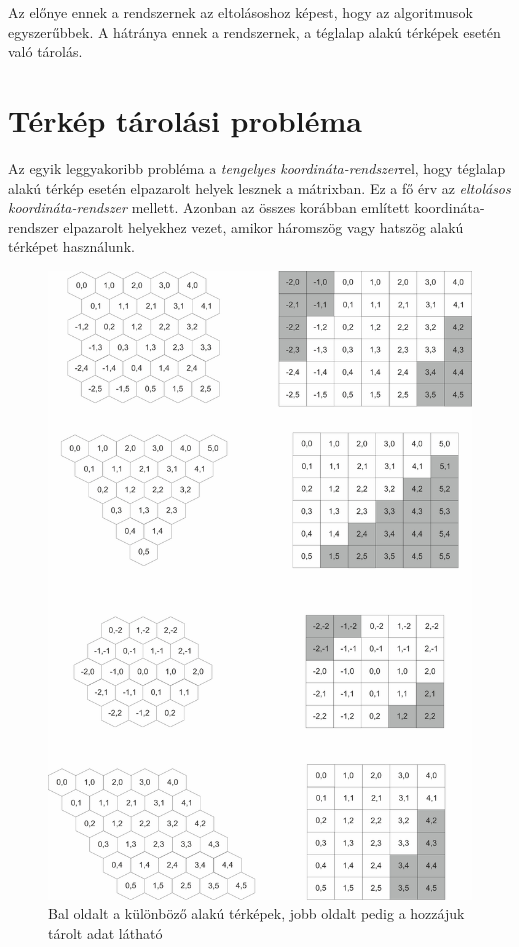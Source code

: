 \noindent Az előnye ennek a rendszernek az eltolásoshoz képest, hogy az algoritmusok egyszerűbbek. A hátránya ennek a rendszernek, a téglalap alakú térképek esetén való tárolás. 

\newpage 

\section{Térkép tárolási probléma}

Az egyik leggyakoribb probléma a \textit{tengelyes koordináta-rendszer}rel, hogy téglalap alakú térkép esetén elpazarolt helyek lesznek a mátrixban. Ez a fő érv az \textit{eltolásos koordináta-rendszer} mellett. Azonban az összes korábban említett koordináta-rendszer elpazarolt helyekhez vezet, amikor háromszög vagy hatszög alakú térképet használunk.
\newline

\begin{figure}[h!]
\centering
\includegraphics[scale=0.2]{kepek/StorageProblem.jpg}
\caption{Bal oldalt a különböző alakú térképek, jobb oldalt pedig a hozzájuk tárolt adat látható}
\label{fig:StorageProblem}
\end{figure}

